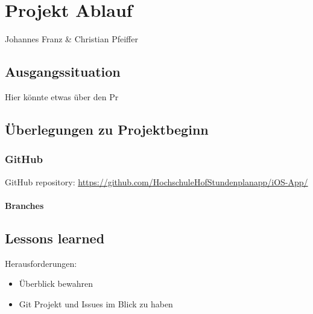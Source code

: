 \chapter{Projekt Ablauf}
Johannes Franz \& Christian Pfeiffer

\section{Ausgangssituation}
Hier könnte etwas über den Pr\\


\newpage
\section{Überlegungen zu Projektbeginn}

\subsection{GitHub}

GitHub repository: \url{https://github.com/HochschuleHofStundenplanapp/iOS-App/}


\subsubsection{Branches}



\section{Lessons learned}

Herausforderungen:
\begin{itemize}
\item Überblick bewahren
\item Git Projekt und Issues im Blick zu haben
\end{itemize}
